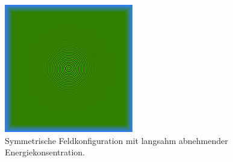 \begin{figure}
    \begin{center}
        \includegraphics[width=0.5\textwidth]{papers/particles/figures/wavesim/particle_initial_state.png}
        \caption{Symmetrische Feldkonfiguration mit langsahm abnehmender Energiekonsentration.\ }\label{particles:fig:partikel:abnehmen:symmetrisch}
    \end{center}
\end{figure}